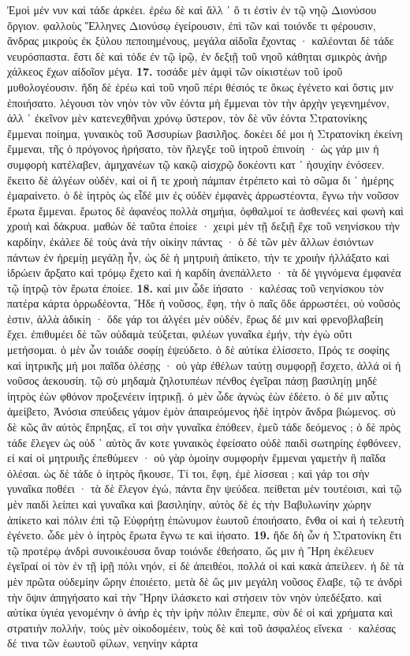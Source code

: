 \documentclass[a4paper, 11pt, oneside, polutonikogreek, german]{article}
\begin{document}
Ἐμοὶ μέν νυν καὶ τάδε ἀρκέει. ἐρέω δὲ καὶ ἄλλ ᾽ ὅ τι ἐστὶν ἐν τῷ νηῷ Διονύσου ὄργιον. φαλλοὺς Ἕλληνες Διονύσῳ ἐγείρουσιν, ἐπὶ τῶν καὶ τοιόνδε τι φέρουσιν, ἄνδρας μικροὺς ἐκ ξύλου πεποιημένους, μεγάλα αἰδοῖα ἔχοντας · καλέονται δὲ τάδε νευρόσπαστα. ἔστι δὲ καὶ τόδε ἐν τῷ ἱρῷ, ἐν δεξιῇ τοῦ νηοῦ κάθηται σμικρὸς ἀνὴρ χάλκεος ἔχων αἰδοῖον μέγα. \textbf{17.} τοσάδε μὲν ἀμφὶ τῶν οἰκιστέων τοῦ ἱροῦ μυθολογέουσιν. ἤδη δὲ ἐρέω καὶ τοῦ νηοῦ πέρι θέσιός τε ὅκως ἐγένετο καὶ ὅστις μιν ἐποιήσατο. λέγουσι τὸν νηὸν τὸν νῦν ἐόντα μὴ ἔμμεναι τὸν τὴν ἀρχὴν γεγενημένον, ἀλλ ᾽ ἐκεῖνον μὲν κατενεχθῆναι χρόνῳ ὕστερον, τὸν δὲ νῦν ἐόντα Στρατονίκης ἔμμεναι ποίημα, γυναικὸς τοῦ Ἀσσυρίων βασιλῆος. δοκέει δέ μοι ἡ Στρατονίκη ἐκείνη ἔμμεναι, τῆς ὁ πρόγονος ἠρήσατο, τὸν ἤλεγξε τοῦ ἰητροῦ ἐπινοίη · ὡς γάρ μιν ἡ συμφορὴ κατέλαβεν, ἀμηχανέων τῷ κακῷ αἰσχρῷ δοκέοντι κατ ᾽ ἡσυχίην ἐνόσεεν. ἔκειτο δὲ ἀλγέων οὐδέν, καί οἱ ἥ τε χροιὴ πάμπαν ἐτρέπετο καὶ τὸ σῶμα δι ᾽ ἡμέρης ἐμαραίνετο. ὁ δὲ ἰητρὸς ὡς εἶδέ μιν ἐς οὐδὲν ἐμφανὲς ἀρρωστέοντα, ἔγνω τὴν νοῦσον ἔρωτα ἔμμεναι. ἔρωτος δὲ ἀφανέος πολλὰ σημήια, ὀφθαλμοί τε ἀσθενέες καὶ φωνὴ καὶ χροιὴ καὶ δάκρυα. μαθὼν δὲ ταῦτα ἐποίεε · χειρὶ μὲν τῇ δεξιῇ ἔχε τοῦ νεηνίσκου τὴν καρδίην, ἐκάλεε δὲ τοὺς ἀνὰ τὴν οἰκίην πάντας · ὁ δὲ τῶν μὲν ἄλλων ἐσιόντων πάντων ἐν ἠρεμίῃ μεγάλῃ ἦν, ὡς δὲ ἡ μητρυιὴ ἀπίκετο, τήν τε χροιὴν ἠλλάξατο καὶ ἱδρώειν ἄρξατο καὶ τρόμῳ ἔχετο καὶ ἡ καρδίη ἀνεπάλλετο · τὰ δὲ γιγνόμενα ἐμφανέα τῷ ἰητρῷ τὸν ἔρωτα ἐποίεε. \textbf{18.} καί μιν ὧδε ἰήσατο · καλέσας τοῦ νεηνίσκου τὸν πατέρα κάρτα ὀρρωδέοντα, Ἥδε ἡ νοῦσος, ἔφη, τὴν ὁ παῖς ὅδε ἀρρωστέει, οὐ νοῦσός ἐστιν, ἀλλὰ ἀδικίη · ὅδε γάρ τοι ἀλγέει μὲν οὐδέν, ἔρως δέ μιν καὶ φρενοβλαβείη ἔχει. ἐπιθυμέει δὲ τῶν οὐδαμὰ τεύξεται, φιλέων γυναῖκα ἐμήν, τὴν ἐγὼ οὔτι μετήσομαι. ὁ μὲν ὦν τοιάδε σοφίῃ ἐψεύδετο. ὁ δὲ αὐτίκα ἐλίσσετο, Πρός τε σοφίης καὶ ἰητρικῆς μή μοι παῖδα ὀλέσῃς · οὐ γὰρ ἐθέλων ταύτῃ συμφορῇ ἔσχετο, ἀλλά οἱ ἡ νοῦσος ἀεκουσίη. τῷ σὺ μηδαμὰ ζηλοτυπέων πένθος ἐγεῖραι πάσῃ βασιληίῃ μηδὲ ἰητρὸς ἐὼν φθόνον προξενέειν ἰητρικῇ. ὁ μὲν ὧδε ἀγνὼς ἐὼν ἐδέετο. ὁ δέ μιν αὖτις ἀμείβετο, Ἀνόσια σπεύδεις γάμον ἐμὸν ἀπαιρεόμενος ἡδὲ ἰητρὸν ἄνδρα βιώμενος. σὺ δὲ κῶς ἂν αὐτὸς ἔπρηξας, εἴ τοι σὴν γυναῖκα ἐπόθεεν, ἐμεῦ τάδε δεόμενος ; ὁ δὲ πρὸς τάδε ἔλεγεν ὡς οὐδ ᾽ αὐτὸς ἄν κοτε γυναικὸς ἐφείσατο οὐδὲ παιδὶ σωτηρίης ἐφθόνεεν, εἰ καί οἱ μητρυιῆς ἐπεθύμεεν · οὐ γὰρ ὁμοίην συμφορὴν ἔμμεναι γαμετὴν ἢ παῖδα ὀλέσαι. ὡς δὲ τάδε ὁ ἰητρὸς ἤκουσε, Τί τοι, ἔφη, ἐμὲ λίσσεαι ; καὶ γάρ τοι σὴν γυναῖκα ποθέει · τὰ δὲ ἔλεγον ἐγώ, πάντα ἔην ψεύδεα. πείθεται μὲν τουτέοισι, καὶ τῷ μὲν παιδὶ λείπει καὶ γυναῖκα καὶ βασιληίην, αὐτὸς δὲ ἐς τὴν Βαβυλωνίην χώρην ἀπίκετο καὶ πόλιν ἐπὶ τῷ Εὐφρήτῃ ἐπώνυμον ἑωυτοῦ ἐποιήσατο, ἔνθα οἱ καὶ ἡ τελευτὴ ἐγένετο. ὧδε μὲν ὁ ἰητρὸς ἔρωτα ἔγνω τε καὶ ἰήσατο. \textbf{19.} ἥδε δὴ ὦν ἡ Στρατονίκη ἔτι τῷ προτέρῳ ἀνδρὶ συνοικέουσα ὄναρ τοιόνδε ἐθεήσατο, ὥς μιν ἡ Ἥρη ἐκέλευεν ἐγεῖραί οἱ τὸν ἐν τῇ ἱρῇ πόλι νηόν, εἰ δὲ ἀπειθέοι, πολλά οἱ καὶ κακὰ ἀπείλεεν. ἡ δὲ τὰ μὲν πρῶτα οὐδεμίην ὤρην ἐποιέετο, μετὰ δὲ ὥς μιν μεγάλη νοῦσος ἔλαβε, τῷ τε ἀνδρὶ τὴν ὄψιν ἀπηγήσατο καὶ τὴν Ἥρην ἱλάσκετο καὶ στήσειν τὸν νηὸν ὑπεδέξατο. καὶ αὐτίκα ὑγιέα γενομένην ὁ ἀνὴρ ἐς τὴν ἱρὴν πόλιν ἔπεμπε, σὺν δέ οἱ καὶ χρήματα καὶ στρατιὴν πολλήν, τοὺς μὲν οἰκοδομέειν, τοὺς δὲ καὶ τοῦ ἀσφαλέος εἵνεκα · καλέσας δέ τινα τῶν ἑωυτοῦ φίλων, νεηνίην κάρτα 
\end{document}
